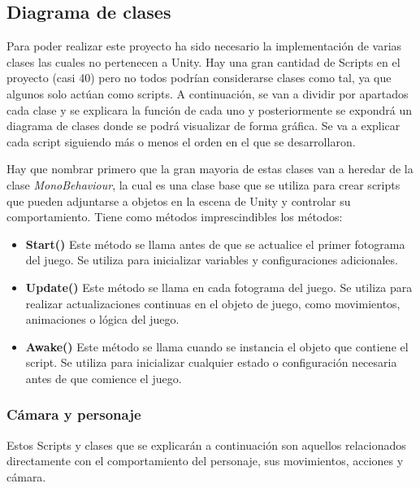 \subsection{Diagrama de clases}

Para poder realizar este proyecto ha sido necesario la implementación de varias clases las cuales no pertenecen a Unity. Hay una gran cantidad de Scripts en el proyecto (casi 40) pero no todos podrían considerarse clases como tal, ya que algunos solo actúan como scripts. A continuación, se van a dividir por apartados cada clase y se explicara la función de cada uno y posteriormente se expondrá un diagrama de clases donde se podrá visualizar de forma gráfica. Se va a explicar cada script siguiendo más o menos el orden en el que se desarrollaron.

Hay que nombrar primero que la gran mayoria de estas clases van a heredar de la clase \textit{MonoBehaviour}, la cual es una clase base que se utiliza para crear scripts que pueden adjuntarse a objetos en la escena de Unity y controlar su comportamiento. Tiene como métodos imprescindibles los métodos:

\begin{itemize}    
    \item \textbf{Start()} Este método se llama antes de que se actualice el primer fotograma del juego. Se utiliza para inicializar variables y configuraciones adicionales.
   
    \item \textbf{Update()} Este método se llama en cada fotograma del juego. Se utiliza para realizar actualizaciones continuas en el objeto de juego, como movimientos, animaciones o lógica del juego.

    \item \textbf{Awake()}  Este método se llama cuando se instancia el objeto que contiene el script. Se utiliza para inicializar cualquier estado o configuración necesaria antes de que comience el juego.
\end{itemize}

\subsubsection{Cámara y personaje}

Estos Scripts y clases que se explicarán a continuación son aquellos relacionados directamente con el comportamiento del personaje, sus movimientos, acciones y cámara.

